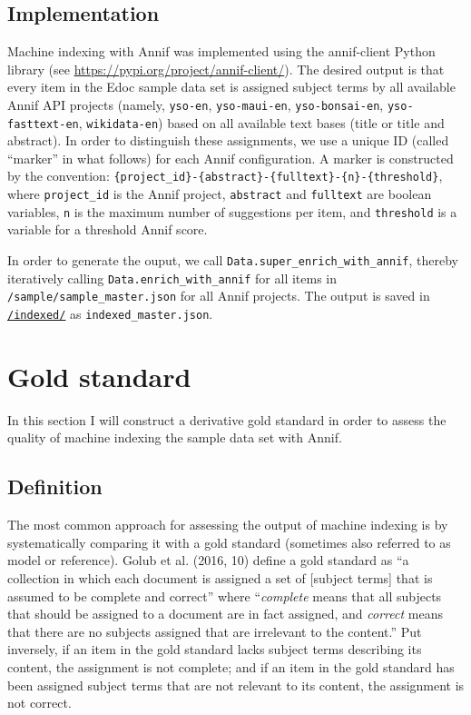 \hypertarget{implementation}{%
\subsection{Implementation}\label{implementation}}

Machine indexing with Annif was implemented using the annif-client
Python library (see \url{https://pypi.org/project/annif-client/}). The
desired output is that every item in the Edoc sample data set is
assigned subject terms by all available Annif API projects (namely,
\texttt{yso-en}, \texttt{yso-maui-en}, \texttt{yso-bonsai-en},
\texttt{yso-fasttext-en}, \texttt{wikidata-en}) based on all available
text bases (title or title and abstract). In order to distinguish these
assignments, we use a unique ID (called ``marker'' in what follows) for
each Annif configuration. A marker is constructed by the convention:
\texttt{\{project\_id\}-\{abstract\}-\{fulltext\}-\{n\}-\{threshold\}},
where \texttt{project\_id} is the Annif project, \texttt{abstract} and
\texttt{fulltext} are boolean variables, \texttt{n} is the maximum
number of suggestions per item, and \texttt{threshold} is a variable for
a threshold Annif score.

In order to generate the ouput, we call
\texttt{Data.super\_enrich\_with\_annif}, thereby iteratively calling
\texttt{Data.enrich\_with\_annif} for all items in
\texttt{/sample/sample\_master.json} for all Annif projects. The output
is saved in
\href{https://github.com/MHindermann/mas/tree/main/files/indexed}{\texttt{/indexed/}}
as \texttt{indexed\_master.json}.

\hypertarget{gold-standard}{%
\section{Gold standard}\label{gold-standard}}

In this section I will construct a derivative gold standard in order to
assess the quality of machine indexing the sample data set with Annif.

\hypertarget{definition}{%
\subsection{Definition}\label{definition}}

The most common approach for assessing the output of machine indexing is
by systematically comparing it with a gold standard (sometimes also
referred to as model or reference). Golub et al. (2016, 10) define a
gold standard as ``a collection in which each document is assigned a set
of {[}subject terms{]} that is assumed to be complete and correct''
where ``\emph{complete} means that all subjects that should be assigned
to a document are in fact assigned, and \emph{correct} means that there
are no subjects assigned that are irrelevant to the content.'' Put
inversely, if an item in the gold standard lacks subject terms
describing its content, the assignment is not complete; and if an item
in the gold standard has been assigned subject terms that are not
relevant to its content, the assignment is not correct.

